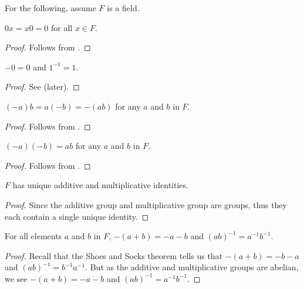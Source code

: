For the following, assume $F$ is a field.

\begin{proposition}
    $0x = x0 = 0$ for all $x \in F$.
\end{proposition}
\begin{proof}
    Follows from .
\end{proof}

\begin{proposition}
    $-0 = 0$ and $1^{-1} = 1$.
\end{proposition}
\begin{proof}
    See  (later).
\end{proof}

\begin{proposition}
    $(-a)b = a(-b) = -(ab)$ for any $a$ and $b$ in $F$.
\end{proposition}
\begin{proof}
    Follows from .
\end{proof}

\begin{proposition}
    $(-a)(-b) = ab$ for any $a$ and $b$ in $F$.
\end{proposition}
\begin{proof}
    Follows from .
\end{proof}

\begin{proposition}
    $F$ has unique additive and multiplicative identities.
\end{proposition}
\begin{proof}
    Since the additive group and multiplicative group are groups, thus they each contain a single unique identity.
\end{proof}

\begin{proposition}
    For all elements $a$ and $b$ in $F$, $-(a+b) = -a-b$ and $(ab)^{-1} = a^{-1}b^{-1}$.
\end{proposition}
\begin{proof}
    Recall that the Shoes and Socks theorem tells us that $-(a+b) = -b - a$ and $(ab)^{-1} = b^{-1}a^{-1}$. But as the additive and multiplicative groups are abelian, we see $-(a+b) = -a-b$ and $(ab)^{-1} = a^{-1}b^{-1}$.
\end{proof}

